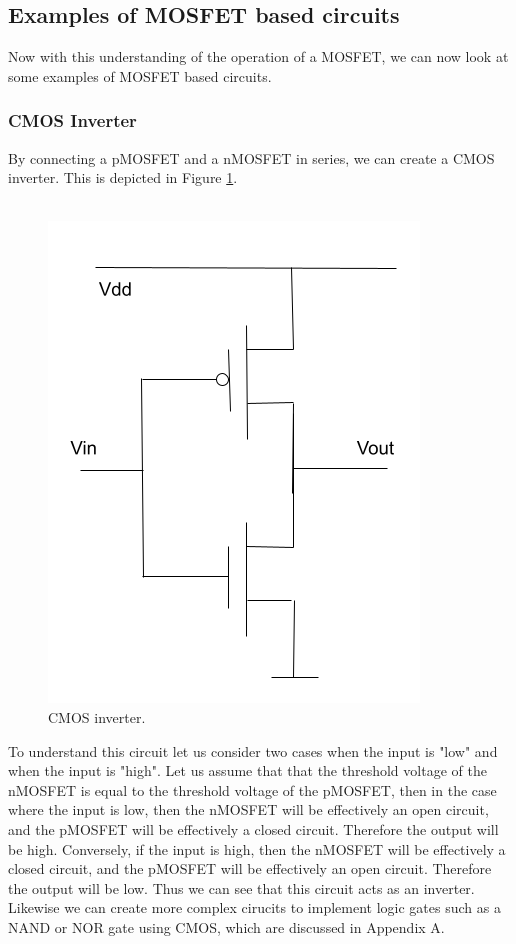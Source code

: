 \documentclass[
  reprint,
  amsmath,amssymb,
  aps
]{revtex4-1}
\begin{document}
\subsection{\label{sec:level2}Examples of MOSFET based circuits}
Now with this understanding of the operation of a MOSFET, we can now look at some examples of MOSFET based circuits.
\subsubsection{\label{sec:level3}CMOS Inverter}
By connecting a pMOSFET and a nMOSFET in series, we can create a CMOS inverter. This is depicted in Figure \ref{fig:cmos inverter}.\\\\
\begin{figure}[H]
    \centering
    \includegraphics[width=0.75\linewidth]{cmos_inverter.png}
    \caption{CMOS inverter.}
    \label{fig:cmos inverter}
\end{figure}
To understand this circuit let us consider two cases when the input is "low" and when the input is "high". Let us assume that 
that the threshold voltage of the nMOSFET is equal to the threshold voltage of the pMOSFET, then in the 
case where the input is low, then the nMOSFET will be effectively an open circuit, and the pMOSFET will be effectively a closed circuit. Therefore the output will be high. 
Conversely, if the input is high, then the nMOSFET will be effectively a closed circuit, and the pMOSFET will be effectively an open circuit. 
Therefore the output will be low. Thus we can see that this circuit acts as an inverter. Likewise we can create more 
complex cirucits to implement logic gates such as a NAND or NOR gate using CMOS, which are discussed in Appendix A.
\end{document}
